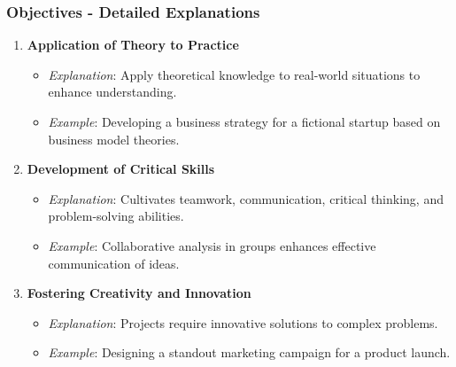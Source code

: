 \documentclass[aspectratio=169]{beamer}
\begin{document}
\begin{frame}[fragile]
    \frametitle{Objectives - Detailed Explanations}
    \begin{enumerate}
        \setcounter{enumi}{0}
        \item 
        \textbf{Application of Theory to Practice}
        \begin{itemize}
            \item \textit{Explanation}: Apply theoretical knowledge to real-world situations to enhance understanding.
            \item \textit{Example}: Developing a business strategy for a fictional startup based on business model theories.
        \end{itemize}

        \item 
        \textbf{Development of Critical Skills}
        \begin{itemize}
            \item \textit{Explanation}: Cultivates teamwork, communication, critical thinking, and problem-solving abilities.
            \item \textit{Example}: Collaborative analysis in groups enhances effective communication of ideas.
        \end{itemize}

        \item 
        \textbf{Fostering Creativity and Innovation}
        \begin{itemize}
            \item \textit{Explanation}: Projects require innovative solutions to complex problems.
            \item \textit{Example}: Designing a standout marketing campaign for a product launch.
        \end{itemize}
    \end{enumerate}
\end{frame}
\end{document}
